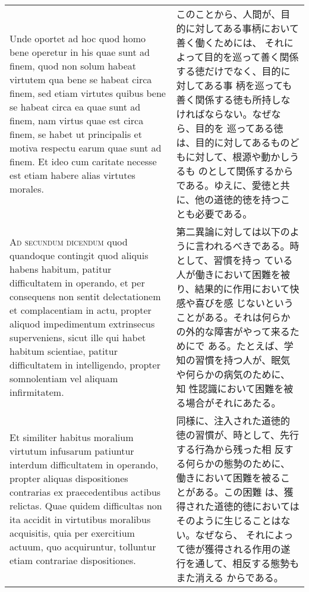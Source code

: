 \documentclass[10pt]{jsarticle}
\begin{document}
\begin{longtable}{p{21em}p{21em}}
\\

 Unde oportet ad hoc quod homo bene operetur in his quae sunt ad
 finem, quod non solum habeat virtutem qua bene se habeat circa finem,
 sed etiam virtutes quibus bene se habeat circa ea quae sunt ad finem,
 nam virtus quae est circa finem, se habet ut principalis et motiva
 respectu earum quae sunt ad finem. Et ideo cum caritate necesse est
 etiam habere alias virtutes morales.
 
&

 このことから、人間が、目的に対してある事柄において善く働くためには、
 それによって目的を巡って善く関係する徳だけでなく、目的に対してある事
 柄を巡っても善く関係する徳も所持しなければならない。なぜなら、目的を
 巡ってある徳は、目的に対してあるものどもに対して、根源や動かしうるも
 のとして関係するからである。ゆえに、愛徳と共に、他の道徳的徳を持つこ
 とも必要である。

\\

 {\scshape Ad secundum dicendum} quod quandoque contingit quod aliquis
 habens habitum, patitur difficultatem in operando, et per consequens
 non sentit delectationem et complacentiam in actu, propter aliquod
 impedimentum extrinsecus superveniens, sicut ille qui habet habitum
 scientiae, patitur difficultatem in intelligendo, propter
 somnolentiam vel aliquam infirmitatem.

 
&

 第二異論に対しては以下のように言われるべきである。時として、習慣を持っ
 ている人が働きにおいて困難を被り、結果的に作用において快感や喜びを感
 じないということがある。それは何らかの外的な障害がやって来るためにで
 ある。たとえば、学知の習慣を持つ人が、眠気や何らかの病気のために、知
 性認識において困難を被る場合がそれにあたる。

\\

 Et similiter habitus moralium virtutum infusarum patiuntur interdum
 difficultatem in operando, propter aliquas dispositiones contrarias
 ex praecedentibus actibus relictas. Quae quidem difficultas non ita
 accidit in virtutibus moralibus acquisitis, quia per exercitium
 actuum, quo acquiruntur, tolluntur etiam contrariae dispositiones.

&

同様に、注入された道徳的徳の習慣が、時として、先行する行為から残った相
反する何らかの態勢のために、働きにおいて困難を被ることがある。この困難
は、獲得された道徳的徳においてはそのように生じることはない。なぜなら、
それによって徳が獲得される作用の遂行を通して、相反する態勢もまた消える
からである。


\end{longtable}
\end{document}

